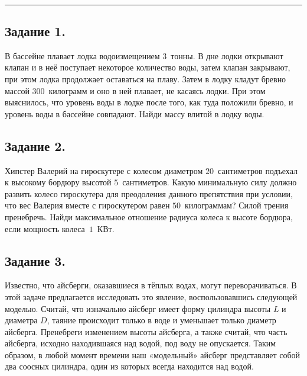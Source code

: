 \\
\rule[0.5\baselineskip]{\textwidth}{1pt}

\vspace{0\baselineskip}

\subsection*{Задание 1.}

В бассейне плавает лодка водоизмещением $3$~тонны. В дне лодки открывают клапан и в неё поступает некоторое количество воды, затем клапан закрывают, при этом лодка продолжает оставаться на плаву. Затем в лодку кладут бревно массой $300$~килограмм и оно в ней плавает, не касаясь лодки. При этом выяснилось, что уровень воды в лодке после того, как туда положили бревно, и уровень воды в бассейне совпадают. Найди массу влитой в лодку воды.

\subsection*{Задание 2.}

Хипстер Валерий на гироскутере с колесом диаметром $20$~сантиметров подъехал к высокому бордюру высотой $5$~сантиметров. Какую минимальную силу должно развить колесо гироскутера для преодоления данного препятствия при условии, что вес Валерия вместе с гироскутером равен $50$~килограммам? Силой трения пренебречь. Найди максимальное отношение радиуса колеса к высоте бордюра, если мощность колеса~$1$~КВт.

\subsection*{Задание 3.}
Известно, что айсберги, оказавшиеся в тёплых водах, могут переворачиваться. В этой задаче предлагается исследовать это явление, воспользовавшись следующей моделью. Считай, что изначально айсберг имеет форму цилиндра высоты $L$ и диаметра $D$, таяние происходит только в воде и уменьшает только диаметр айсберга. Пренебреги изменением высоты айсберга, а также считай, что часть айсберга, исходно находившаяся над водой, под воду не опускается. Таким образом, в любой момент времени наш «модельный» айсберг представляет собой два соосных цилиндра, один из которых всегда находится над водой.

